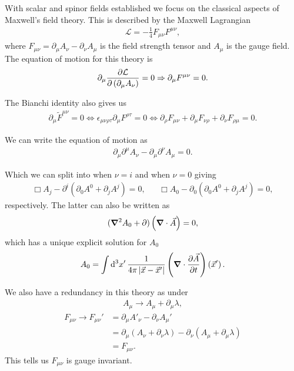 
With scalar and spinor fields established we focus on the classical aspects of Maxwell's field theory. This is described by the Maxwell Lagrangian
\begin{align}
    \mathcal{L} = -\frac{1}{4} F_{\mu \nu} F^{\mu \nu}
,\end{align}
where $F_{\mu \nu} = \partial_\mu A_\nu - \partial_\nu A_\mu$ is the field strength tensor and $A_\mu$ is the gauge field. The equation of motion for this theory is
\begin{align}
    \partial_\mu \pdv{\mathcal{L}}{\left( \partial_\mu A_\nu \right) } = 0 \Rightarrow \partial_\mu F^{\mu \nu} = 0
.\end{align}

The Bianchi identity also gives us
\begin{align}
    \partial_\mu \widetilde{F}^{\mu \nu} = 0 \iff \epsilon_{\mu \nu \rho \tau} \partial_\mu F^{\rho \tau} = 0 \iff\partial_\rho F_{\mu \nu} + \partial_\mu F_{\nu \rho} + \partial_\nu F_{\rho \mu} = 0
.\end{align}

We can write the equation of motion as
\begin{align}
    \partial_\mu \partial^{\mu} A_\nu - \partial_\mu \partial^{\nu} A_\mu = 0
.\end{align}

Which we can split into when $\nu = i$ and when $\nu = 0$ giving
\begin{align}
    \Box A_j - \partial^{i} \left( \partial_0 A^{0} + \partial_j A^{j} \right) = 0, && \Box A_0 - \partial_0 \left( \partial_0 A^{0} +\partial_j A^{j}  \right) = 0
,\end{align}
respectively. The latter can also be written as
\begin{align}
    (\grad^2 A_0 + \partial) \left( \grad \cdot \vec{A} \right) = 0
,\end{align}
which has a unique explicit solution for $A_0$
\begin{align}
    A_0 = \int \dd{^3x'} \frac{1}{4\pi \left| \vec{x} - \vec{x}' \right| } \left( \grad \cdot \pdv{\vec{A}}{t} \right) \left( \vec{x}' \right) 
.\end{align}

\begin{note}
    We also have a redundancy in this theory as under
    \begin{align}
        A_{\mu} \to A_{\mu} + \partial_\mu \lambda
    ,\end{align}
    \begin{align}
        F_{\mu \nu} \to F_{\mu \nu}' &= \partial_\mu A'_{\nu} - \partial_\nu A_{\mu}' \\
        &= \partial_\mu \left( A_{\nu} + \partial_\nu \lambda \right) - \partial_\nu \left( A_\mu + \partial_\mu \lambda \right)  \\
        &= F_{\mu \nu}
    .\end{align}
    This tells us $F_{\mu \nu}$ is gauge invariant.
\end{note}

